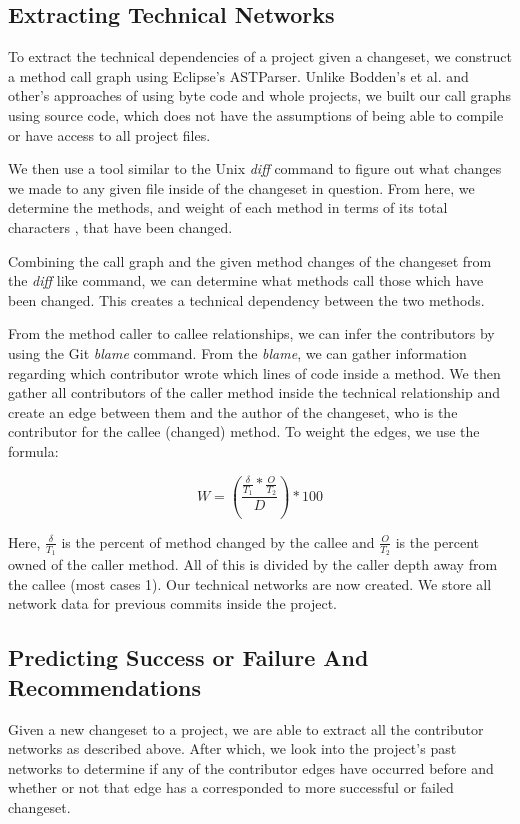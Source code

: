 \documentclass[conference]{IEEEtran}
\begin{document}
\subsection{Extracting Technical Networks}
To extract the technical dependencies of a project given a changeset, we construct a method
call graph using Eclipse's ASTParser. 
Unlike  Bodden's et al. \cite{Bodden:2003:HVJ} and other's approaches of using byte code
and whole projects, we built our call graphs using source code, which does not have the assumptions
of being able to compile or have access to all project files.

We then use a tool similar to the Unix \textit{diff} command to figure out what changes we made 
to any given file inside of the changeset in question. From here, we determine the methods, 
and weight of each method in terms of its total characters , that have been changed.

Combining the call graph and the given method changes of the changeset from the \textit{diff} like 
command,  we can determine what methods call those which have been changed. This creates a 
technical dependency between the two methods.

From the method caller to callee relationships, we can infer the contributors by using
the Git \textit{blame} command. From the \textit{blame}, we can gather information regarding which 
contributor  wrote which lines of code inside a method. We then gather all contributors of the 
caller method inside the technical relationship and create an edge between them and 
the author of the changeset, who is the contributor for the 
callee (changed) method. To weight the edges, we use the formula:

\begin{equation}\label{first}
W = (\frac{\frac{\delta}{T_{1}}*\frac{O}{T_{2}}}{D})*100
\end{equation}

Here, $\frac{\delta}{T_{1}}$ is the percent of method changed by the callee and $\frac{O}{T_{2}}$ 
is the percent owned of the caller method. All of this is divided by the caller depth away from 
the callee (most cases 1).  Our technical networks are now created. We store all network data for
previous commits inside the project.

\subsection{Predicting Success or Failure And Recommendations}
Given a new changeset to a project, we are able to extract all the contributor networks as described
above. After which, we look into the project's past networks to determine if any of the contributor edges have
occurred before and whether or not that edge has a  corresponded to more successful or failed changeset. 
\end{document}
